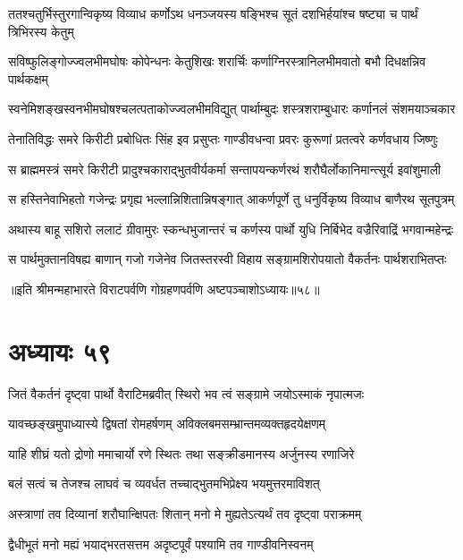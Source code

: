 \twolineshloka
{ततश्चतुर्भिस्तुरगान्विकृष्य विव्याध कर्णोऽथ धनञ्जयस्य}
{षङ्भिश्च सूतं दशभिर्हयांश्च षष्ट्या च पार्थं त्रिभिरस्य केतुम्}


\twolineshloka
{सविष्फुलिङ्गोज्ज्वलभीमघोषः कोपेन्धनः केतुशिखः शरार्चिः}
{कर्णाग्निरस्त्रानिलभीमवातो बभौ दिधक्षन्निव पार्थकक्षम्}


\twolineshloka
{स्वनेमिशङ्खस्वनभीमघोषश्चलत्पताकोज्ज्वलभीमविद्युत्}
{पार्थाम्बुदः शस्त्रशराम्बुधारः कर्णानलं संशमयाञ्चकार}


\twolineshloka
{तेनातिविद्धः समरे किरीटी प्रबोधितः सिंह इव प्रसुप्तः}
{गाण्डीवधन्वा प्रवरः कुरूणां प्रतत्वरे कर्णवधाय जिष्णुः}


\twolineshloka
{स ब्राह्ममस्त्रं समरे किरीटी प्रादुश्चकाराद्भुतवीर्यकर्मा}
{सन्तापयन्कर्णरथं शरौघैर्लोकानिमान्त्सूर्य इवांशुमाली}


\twolineshloka
{स हस्तिनेवाभिहतो गजेन्द्रः प्रगृह्य भल्लान्निशितान्निषङ्गात्}
{आकर्णपूर्णे तु धनुर्विकृष्य विव्याध बाणैरथ सूतपुत्रम्}


\twolineshloka
{अथास्य बाहू सशिरो ललाटं ग्रीवामुरः स्कन्धभुजान्तरं च}
{कर्णस्य पार्थो युधि निर्बिभेद वज्रैरिवाद्रिं भगवान्महेन्द्रः}


\twolineshloka
{स पार्थमुक्तानविषह्य बाणान् गजो गजेनेव जितस्तरस्वी}
{विहाय सङ्ग्रामशिरोपयातो वैकर्तनः पार्थशराभितप्तः}

॥इति श्रीमन्महाभारते विराटपर्वणि गोग्रहणपर्वणि अष्टपञ्चाशोऽध्यायः॥५८॥

\chapter{अध्यायः ५९}

\twolineshloka
{जितं वैकर्तनं दृष्ट्वा पार्थो वैराटिमब्रवीत्}
{स्थिरो भव त्वं सङ्ग्रामे जयोऽस्माकं नृपात्मजः}


\twolineshloka
{यावच्छङ्खमुपाध्यास्ये द्विषतां रोमहर्षणम्}
{अविक्लबमसम्भ्रान्तमव्यक्तहृदयेक्षणम्}



\twolineshloka
{याहि शीघ्रं यतो द्रोणो ममाचार्यो रणे स्थितः}
{तथा सङ्क्रीडमानस्य अर्जुनस्य रणाजिरे}


\twolineshloka
{बलं सत्वं च तेजश्च लाघवं च व्यवर्धत}
{तच्चाद्भुतमभिप्रेक्ष्य भयमुत्तरमाविशत्}


\twolineshloka
{अस्त्राणां तव दिव्यानां शरौघान्क्षिपतः शितान्}
{मनो मे मुह्यतेऽत्यर्थं तव दृष्ट्वा पराक्रमम्}


\twolineshloka
{द्वैधीभूतं मनो मह्यं भयाद्भरतसत्तम}
{अदृष्टपूर्वं पश्यामि तव गाण्डीवनिस्वनम्}


